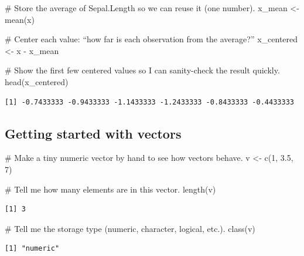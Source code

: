 \documentclass[
  letterpaper,
  DIV=11,
  numbers=noendperiod]{scrreprt}
\newenvironment{Shaded}{\begin{snugshade}}{\end{snugshade}}
\newcommand{\CommentTok}[1]{\textcolor[rgb]{0.37,0.37,0.37}{#1}}
\newcommand{\DecValTok}[1]{\textcolor[rgb]{0.68,0.00,0.00}{#1}}
\newcommand{\FloatTok}[1]{\textcolor[rgb]{0.68,0.00,0.00}{#1}}
\newcommand{\FunctionTok}[1]{\textcolor[rgb]{0.28,0.35,0.67}{#1}}
\newcommand{\NormalTok}[1]{\textcolor[rgb]{0.00,0.23,0.31}{#1}}
\newcommand{\OtherTok}[1]{\textcolor[rgb]{0.00,0.23,0.31}{#1}}
\newcommand{\SpecialCharTok}[1]{\textcolor[rgb]{0.37,0.37,0.37}{#1}}
\begin{document}
\begin{Shaded}
\begin{Highlighting}[]
\CommentTok{\# Store the average of Sepal.Length so we can reuse it (one number).}
\NormalTok{x\_mean }\OtherTok{\textless{}{-}} \FunctionTok{mean}\NormalTok{(x)}

\CommentTok{\# Center each value: “how far is each observation from the average?”}
\NormalTok{x\_centered }\OtherTok{\textless{}{-}}\NormalTok{ x }\SpecialCharTok{{-}}\NormalTok{ x\_mean}

\CommentTok{\# Show the first few centered values so I can sanity{-}check the result quickly.}
\FunctionTok{head}\NormalTok{(x\_centered)}
\end{Highlighting}
\end{Shaded}

\begin{verbatim}
[1] -0.7433333 -0.9433333 -1.1433333 -1.2433333 -0.8433333 -0.4433333
\end{verbatim}

\subsection{Getting started with
vectors}\label{getting-started-with-vectors}

\begin{Shaded}
\begin{Highlighting}[]
\CommentTok{\# Make a tiny numeric vector by hand to see how vectors behave.}
\NormalTok{v }\OtherTok{\textless{}{-}} \FunctionTok{c}\NormalTok{(}\DecValTok{1}\NormalTok{, }\FloatTok{3.5}\NormalTok{, }\DecValTok{7}\NormalTok{)}

\CommentTok{\# Tell me how many elements are in this vector.}
\FunctionTok{length}\NormalTok{(v)}
\end{Highlighting}
\end{Shaded}

\begin{verbatim}
[1] 3
\end{verbatim}

\begin{Shaded}
\begin{Highlighting}[]
\CommentTok{\# Tell me the storage type (numeric, character, logical, etc.).}
\FunctionTok{class}\NormalTok{(v)}
\end{Highlighting}
\end{Shaded}

\begin{verbatim}
[1] "numeric"
\end{verbatim}
\end{document}
